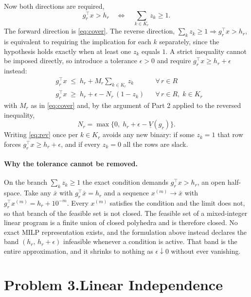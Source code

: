 \documentclass[11pt]{article}
\theoremstyle{definition}\newtheorem*{definition}{Definition}
\theoremstyle{definition}
\begin{document}
Now both directions are required,
\[
  g_r^{\!\top} x > h_r
  \quad\Longleftrightarrow\quad
  \sum_{k \in K_r} z_k \ge 1 .
\]
The forward direction is \eqref{eq:cover}. The reverse direction,
$\sum_{k} z_k \ge 1 \Rightarrow g_r^{\!\top} x > h_r$, is equivalent to
requiring the implication for each $k$ separately, since the hypothesis
holds exactly when at least one $z_k$ equals $1$. A strict inequality
cannot be imposed directly, so introduce a tolerance $\epsilon > 0$ and
require $g_r^{\!\top} x \ge h_r + \epsilon$ instead:
\begin{align}
  & g_r^{\!\top} x \;\le\; h_r + M_r \sum_{k \in K_r} z_k
    && \forall\, r \in R \\
  & g_r^{\!\top} x \;\ge\; h_r + \epsilon - N_r\,(1 - z_k)
    && \forall\, r \in R,\; k \in K_r
  \label{eq:rev}
\end{align}
with $M_r$ as in \eqref{eq:cover} and, by the argument of Part 2 applied
to the reversed inequality,
\[
  N_r = \max\big\{0,\; h_r + \epsilon - \underline{V}(g_r) \big\} .
\]
Writing \eqref{eq:rev} once per $k \in K_r$ avoids any new binary: if
some $z_k = 1$ that row forces $g_r^{\!\top}x \ge h_r + \epsilon$, and if
every $z_k = 0$ all the rows are slack.

\paragraph{Why the tolerance cannot be removed.} On the branch
$\sum_k z_k \ge 1$ the exact condition demands
$g_r^{\!\top} x > h_r$, an open half-space. Take any $\bar{x}$ with
$g_r^{\!\top}\bar{x} = h_r$ and a sequence
$x^{(m)} \to \bar{x}$ with $g_r^{\!\top} x^{(m)} = h_r + 10^{-m}$. Every
$x^{(m)}$ satisfies the condition and the limit does not, so that branch
of the feasible set is not closed. The feasible set of a mixed-integer
linear program is a finite union of closed polyhedra and is therefore
closed. No exact MILP representation exists, and the formulation above
instead declares the band $(h_r,\, h_r + \epsilon)$ infeasible whenever a
condition is active. That band is the entire approximation, and it
shrinks to nothing as $\epsilon \downarrow 0$ without ever vanishing.

\newpage
\section*{Problem 3.\quad Linear Independence \quad[15 pts]}
\end{document}
